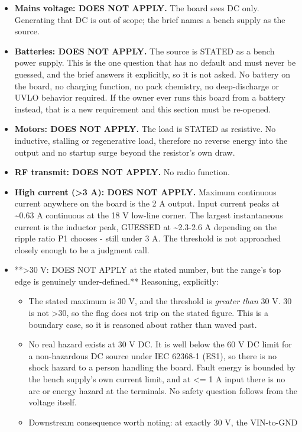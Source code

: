 \documentclass[11pt,a4paper]{article}
\begin{document}
\begin{itemize}
\item \textbf{Mains voltage: DOES NOT APPLY.} The board sees DC only. Generating
that DC is out of scope; the brief names a bench supply as the source.
\item \textbf{Batteries: DOES NOT APPLY.} The source is STATED as a bench power
supply. This is the one question that has no default and must never be
guessed, and the brief answers it explicitly, so it is not asked. No
battery on the board, no charging function, no pack chemistry, no
deep-discharge or UVLO behavior required. If the owner ever runs this
board from a battery instead, that is a new requirement and this
section must be re-opened.
\item \textbf{Motors: DOES NOT APPLY.} The load is STATED as resistive. No
inductive, stalling or regenerative load, therefore no reverse energy
into the output and no startup surge beyond the resistor's own draw.
\item \textbf{RF transmit: DOES NOT APPLY.} No radio function.
\item \textbf{High current (\textgreater{}3 A): DOES NOT APPLY.} Maximum continuous current
anywhere on the board is the 2 A output. Input current peaks at \textasciitilde{}0.63 A
continuous at the 18 V low-line corner. The largest instantaneous
current is the inductor peak, GUESSED at \textasciitilde{}2.3-2.6 A depending on the
ripple ratio P1 chooses - still under 3 A. The threshold is not
approached closely enough to be a judgment call.
\item {*}{*}\textgreater{}30 V: DOES NOT APPLY at the stated number, but the range's top edge
is genuinely under-defined.{*}{*} Reasoning, explicitly:
\begin{itemize}
\item The stated maximum is 30 V, and the threshold is \emph{greater than} 30 V.
30 is not \textgreater{}30, so the flag does not trip on the stated figure. This
is a boundary case, so it is reasoned about rather than waved past.
\item No real hazard exists at 30 V DC. It is well below the 60 V DC limit
for a non-hazardous DC source under IEC 62368-1 (ES1), so there is no
shock hazard to a person handling the board. Fault energy is bounded
by the bench supply's own current limit, and at \textless{}= 1 A input there is
no arc or energy hazard at the terminals. No safety question follows
from the voltage itself.
\item Downstream consequence worth noting: at exactly 30 V, the VIN-to-GND

\end{itemize}
\end{itemize}
\end{document}
